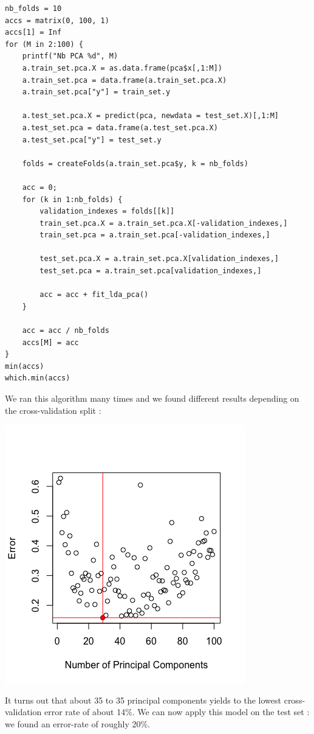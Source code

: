 \documentclass[]{report}
\begin{document}
\begin{lstlisting}
nb_folds = 10
accs = matrix(0, 100, 1)
accs[1] = Inf
for (M in 2:100) {
	printf("Nb PCA %d", M)
	a.train_set.pca.X = as.data.frame(pca$x[,1:M])
	a.train_set.pca = data.frame(a.train_set.pca.X)
	a.train_set.pca["y"] = train_set.y
	
	a.test_set.pca.X = predict(pca, newdata = test_set.X)[,1:M]
	a.test_set.pca = data.frame(a.test_set.pca.X)
	a.test_set.pca["y"] = test_set.y
	
	folds = createFolds(a.train_set.pca$y, k = nb_folds)
	
	acc = 0;
	for (k in 1:nb_folds) {
		validation_indexes = folds[[k]]
		train_set.pca.X = a.train_set.pca.X[-validation_indexes,]
		train_set.pca = a.train_set.pca[-validation_indexes,]
		
		test_set.pca.X = a.train_set.pca.X[validation_indexes,]
		test_set.pca = a.train_set.pca[validation_indexes,]
		
		acc = acc + fit_lda_pca()
	}
	
	acc = acc / nb_folds
	accs[M] = acc
}
min(accs)
which.min(accs)
\end{lstlisting}

We ran this algorithm many times and we found different results depending on the cross-validation split : 

\begin{center}
	\includegraphics[width=0.6\linewidth]{Figures/lda_pca_cv.png}
	\label{fig:lda_pca_cv}
\end{center}

It turns out that about 35 to 35 principal components yields to the lowest cross-validation error rate of about 14\%. We can now apply this model on the test set : we found an error-rate of roughly 20\%.
\end{document}
